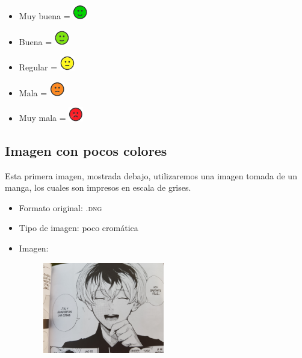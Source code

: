 \documentclass[11pt,a4paper]{article}
\begin{document}
\begin{itemize}
	\item Muy buena = \includegraphics[width=0.05\textwidth]{mb.png}
	\item Buena = \includegraphics[width=0.05\textwidth]{b.png}
	\item Regular = \includegraphics[width=0.05\textwidth]{r.png}
	\item Mala = \includegraphics[width=0.05\textwidth]{m.png}
	\item Muy mala = \includegraphics[width=0.05\textwidth]{mm.png}
\end{itemize}


\subsection{Imagen con pocos colores}

Esta primera imagen, mostrada debajo, utilizaremos una imagen tomada de un manga, los cuales son impresos en escala de grises.

\begin{itemize}
	\item Formato original: \textsc{.dng}
	\item Tipo de imagen: poco cromática
	\item Imagen:
		\begin{figure}[H]
		\centering
			\includegraphics[width=0.5\textwidth]{Fotos/poco_crom.jpg}
		\end{figure}	
\end{itemize}
\end{document}
